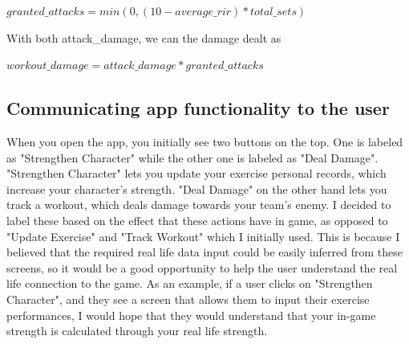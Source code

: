 \documentclass{l4proj}
\begin{document}
\begin{algorithm}
  $granted\_attacks = min(0, (10 - average\_rir) * total\_sets)$
\end{algorithm}

With both attack\_damage, we can the damage dealt as 

\begin{algorithm}
  $workout\_damage = attack\_damage * granted\_attacks$ 
\end{algorithm}


\subsection{Communicating app functionality to the user}

When you open the app, you initially see two buttons on the top. One is labeled as "Strengthen Character" while the other one is labeled as "Deal Damage". "Strengthen Character" lets you update your exercise personal records, which increase your character's strength. "Deal Damage" on the other hand lets you track a workout, which deals damage towards your team's enemy. I decided to label these based on the effect that these actions have in game, as opposed to "Update Exercise" and "Track Workout" which I initially used. This is because I believed that the required real life data input could be easily inferred from these screens, so it would be a good opportunity to help the user understand the real life connection to the game. As an example, if a user clicks on "Strengthen Character", and they see a screen that allows them to input their exercise performances, I would hope that they would understand that your in-game strength is calculated through your real life strength.
\end{document}
